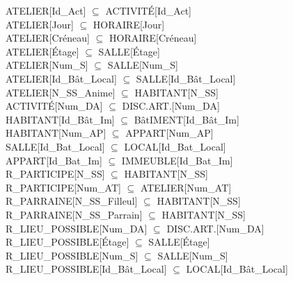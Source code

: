 \documentclass[a4paper,10.5pt]{report}
\begin{document}
	ATELIER[Id\_Act] $\subseteq$ ACTIVITÉ[Id\_Act] \\

	ATELIER[Jour] $\subseteq$ HORAIRE[Jour] \\

	ATELIER[Créneau] $\subseteq$ HORAIRE[Créneau] \\

	ATELIER[Étage] $\subseteq$ SALLE[Étage] \\

	ATELIER[Num\_S] $\subseteq$ SALLE[Num\_S] \\

	ATELIER[Id\_Bât\_Local] $\subseteq$ SALLE[Id\_Bât\_Local] \\

	ATELIER[N\_SS\_Anime] $\subseteq$ HABITANT[N\_SS] \\

	ACTIVITÉ[Num\_DA] $\subseteq$ DISC.ART.[Num\_DA] \\

	HABITANT[Id\_Bât\_Im] $\subseteq$ BâtIMENT[Id\_Bât\_Im] \\

	HABITANT[Num\_AP] $\subseteq$ APPART[Num\_AP] \\

	SALLE[Id\_Bat\_Local] $\subseteq$ LOCAL[Id\_Bat\_Local] \\

	APPART[Id\_Bat\_Im] $\subseteq$ IMMEUBLE[Id\_Bat\_Im] \\

	R\_PARTICIPE[N\_SS]  $\subseteq$ HABITANT[N\_SS] \\

	R\_PARTICIPE[Num\_AT] $\subseteq$ ATELIER[Num\_AT] \\

	R\_PARRAINE[N\_SS\_Filleul] $\subseteq$ HABITANT[N\_SS] \\

	R\_PARRAINE[N\_SS\_Parrain] $\subseteq$ HABITANT[N\_SS] \\

	R\_LIEU\_POSSIBLE[Num\_DA] $\subseteq$ DISC.ART.[Num\_DA] \\

	R\_LIEU\_POSSIBLE[Étage] $\subseteq$ SALLE[Étage] \\

	R\_LIEU\_POSSIBLE[Num\_S] $\subseteq$ SALLE[Num\_S] \\

	R\_LIEU\_POSSIBLE[Id\_Bât\_Local] $\subseteq$ LOCAL[Id\_Bât\_Local] \\
\end{document}
